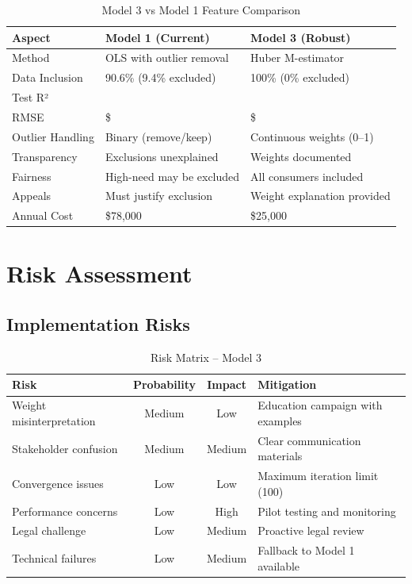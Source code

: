 \begin{table}[h]
\centering
\caption{Model 3 vs Model 1 Feature Comparison}
\begin{tabular}{lll}
\toprule
\textbf{Aspect} & \textbf{Model 1 (Current)} & \textbf{Model 3 (Robust)} \\
\midrule
Method & OLS with outlier removal & Huber M-estimator \\
Data Inclusion & 90.6\% (9.4\% excluded) & 100\% (0\% excluded) \\
Test R² & \ModelOneRSquaredTest{} & \ModelThreeRSquaredTest{} \\
RMSE & \$\ModelOneRMSETest{} & \$\ModelThreeRMSETest{} \\
Outlier Handling & Binary (remove/keep) & Continuous weights (0--1) \\
Transparency & Exclusions unexplained & Weights documented \\
Fairness & High-need may be excluded & All consumers included \\
Appeals & Must justify exclusion & Weight explanation provided \\
Annual Cost & \$78,000 & \$25,000 \\
\bottomrule
\end{tabular}
\end{table}

\section{Risk Assessment}

\subsection{Implementation Risks}

\begin{table}[h]
\centering
\caption{Risk Matrix -- Model 3}
\begin{tabular}{p{3.5cm}ccp{5cm}}
\toprule
\textbf{Risk} & \textbf{Probability} & \textbf{Impact} & \textbf{Mitigation} \\
\midrule
Weight misinterpretation & Medium & Low & Education campaign with examples \\
Stakeholder confusion & Medium & Medium & Clear communication materials \\
Convergence issues & Low & Low & Maximum iteration limit (100) \\
Performance concerns & Low & High & Pilot testing and monitoring \\
Legal challenge & Low & Medium & Proactive legal review \\
Technical failures & Low & Medium & Fallback to Model 1 available \\
\bottomrule
\end{tabular}
\end{table}

